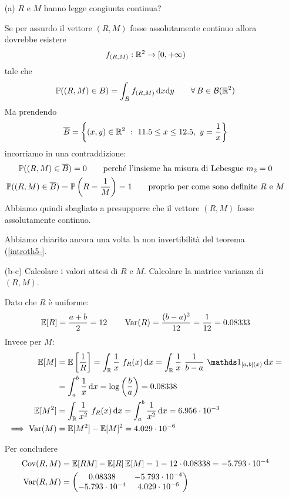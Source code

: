 \begin{enumerate}
\item [(a)] $R$ e $M$ hanno legge congiunta continua?

Se per assurdo il vettore $(R,M)$ fosse assolutamente continuo allora dovrebbe esistere
\[
f_{(R,M)}:\mathbb{R}^2\to[0,+\infty)
\]
tale che
\[
\PP((R,M)\in B)=\int_B f_{(R,M)}\dxy\qquad\forall B\in\Bc(\RR^2)
\]
Ma prendendo
\[
\overline{B}=\left\{(x,y)\in\mathbb{R}^2\ :\ 11.5\leq x\leq 12.5,\ y=\frac{1}{x}  \right\}
\]
incorriamo in una contraddizione:
\begin{gather*} 
\mathbb{P}((R,M)\in \overline{B})=0\qquad\text{perché l'insieme ha misura di Lebesgue }m_2=0 \\
\mathbb{P}((R,M)\in \overline{B})=\mathbb{P}\left(R=\frac{1}{M}\right)=1\qquad\text{proprio per come sono definite }R\text{ e }M
\end{gather*}
Abbiamo quindi sbagliato a presupporre che il vettore $(R,M)$ fosse assolutamente continuo.

\begin{rem} Abbiamo chiarito ancora una volta la non invertibilità del teorema (\ref{introth5-}. \end{rem}

\item [(b-c)] Calcolare i valori attesi di $R$ e $M$. Calcolare la matrice varianza di $(R,M)$.

Dato che $R$ è uniforme:
\[
\mathbb{E}[R]=\frac{a+b}{2}=12 \qquad \operatorname{Var}(R)=\frac{(b-a)^2}{12}=\frac{1}{12}=0.08333
\]
Invece per $M$:
\begin{gather*}
\begin{aligned}
\EE[M]&=\EE\left[ \frac{1}{R} \right]=\int_\RR \frac{1}{x}\ f_R(x)\dx=\int_\RR \frac{1}{x}\ \frac{1}{b-a}\ \Ind_{[a,b](x)}\dx=\\
&=\int_{a}^{b} \frac{1}{x}\dx=\log\left(\frac{b}{a} \right)=0.08338\\
\EE[M^2]&=\int_\RR \frac{1}{x^2}\ f_R(x)\dx=\int_{a}^{b} \frac{1}{x^2}\dx=6.956\cdot 10^{-3}\\
\implies \Var(M)&=\EE[M^2]-\EE[M]^2=4.029\cdot 10^{-6}
\end{aligned}
\end{gather*}

Per concludere
\begin{gather*}
\begin{aligned}
\operatorname{Cov}(R,M)&=\mathbb{E}[RM]-\mathbb{E}[R]\,\mathbb{E}[M]=1-12\cdot 0.08338 = -5.793\cdot 10^{-4}\\
\operatorname{Var}(R,M)&=
\begin{pmatrix}
0.08338 & -5.793\cdot 10^{-4} \\
-5.793\cdot 10^{-4} & 4.029\cdot 10^{-6} \\
\end{pmatrix}
\end{aligned}
\end{gather*}


\end{enumerate}
